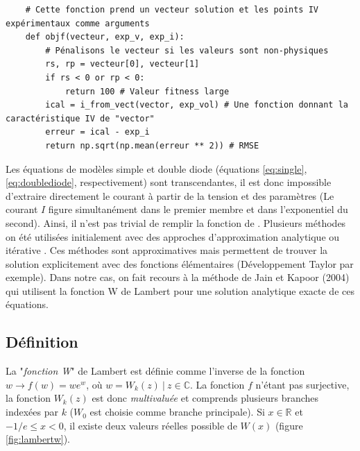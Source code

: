 \noindent
\begin{minipage}{\linewidth}
\begin{verbatim}
    # Cette fonction prend un vecteur solution et les points IV expérimentaux comme arguments
    def objf(vecteur, exp_v, exp_i):
        # Pénalisons le vecteur si les valeurs sont non-physiques
        rs, rp = vecteur[0], vecteur[1]
        if rs < 0 or rp < 0:
            return 100 # Valeur fitness large
        ical = i_from_vect(vector, exp_vol) # Une fonction donnant la caractéristique IV de "vector"
        erreur = ical - exp_i
        return np.sqrt(np.mean(erreur ** 2)) # RMSE         
\end{verbatim}
\end{minipage}
\vspace*{12pt}

Les équations de modèles simple et double diode (équations \ref{eq:single}, \ref{eq:doublediode}, respectivement) sont transcendantes, il est donc impossible d'extraire directement le courant à partir de la tension et des paramètres (Le courant $I$ figure simultanément dans le premier membre et dans l'exponentiel du second). Ainsi, il n'est pas trivial de remplir la fonction de . Plusieurs méthodes on été utilisées initialement avec des approches d'approximation analytique ou itérative \cite{Shur1991,AbuelmaAtti1992,Datta1992}. Ces méthodes sont approximatives mais permettent de trouver la solution explicitement avec des fonctions élémentaires (Développement Taylor par exemple). Dans notre cas, on fait recours à la méthode de Jain et Kapoor (2004) \cite{Jain2004, Lun2015} qui utilisent la fonction W de Lambert pour une solution analytique exacte de ces équations.

\subsection{Définition}
La "\textit{fonction W}" de Lambert est définie comme l'inverse de la fonction $w \rightarrow f(w) =  w e^w$, où $w = W_k(z)\ |\ z \in \mathbb{C}$. La fonction $f$ n'étant pas surjective, la fonction $W_k(z)$ est donc \textit{multivaluée} et comprends plusieurs branches indexées par $k$ ($W_0$ est choisie comme branche principale). Si $x \in \mathbb{R}$ et $-1/e \leq x < 0$, il existe deux valeurs réelles possible de $W(x)$ (figure \ref{fig:lambertw}).

